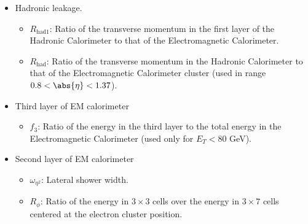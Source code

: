 \begin{itemize}
	\item Hadronic leakage. 
	      \begin{itemize}
		      \item $R_{\text{had1}}$: Ratio of the transverse momentum in the first layer
		            of the Hadronic Calorimeter to that of the Electromagnetic Calorimeter.

		      \item $R_{\text{had}}$: Ratio of the transverse momentum in the Hadronic Calorimeter
		            to that of the Electromagnetic Calorimeter cluster (used in range $0.8 < \abs{\eta} < 1.37$).

	      \end{itemize}

	\item Third layer of EM calorimeter
	      \begin{itemize}
		      \item $f_3$: Ratio of the energy in the third layer to the total energy in the Electromagnetic
		            Calorimeter (used only for $E_T < 80$ GeV).

	      \end{itemize}
	\item Second layer of EM calorimeter
	      \begin{itemize}
		      \item $\omega_{\eta^2}$: Lateral shower width.

		      \item $R_{\phi}$: Ratio of the energy in $3\times 3$ cells over the energy in $3\times 7$ cells
		            centered at the electron cluster position.


\end{itemize}
\end{itemize}
